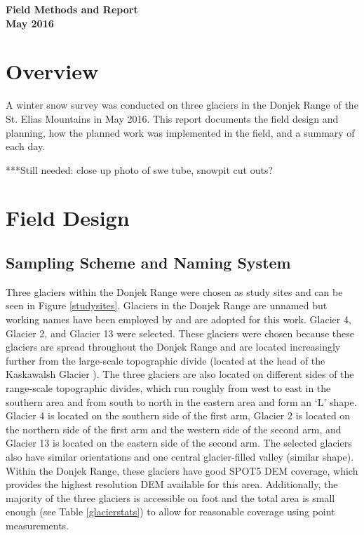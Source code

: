 \documentclass[12pt]{article}
\begin{document}

\begin{center}
\Large \textbf{Field Methods and Report \\ May 2016}
\end{center}


\section*{Overview}

A winter snow survey was conducted on three glaciers in the Donjek Range of the St. Elias Mountains in May 2016. This report documents the field design and planning, how the planned work was implemented in the field, and a summary of each day. 

***Still needed: close up photo of swe tube, snowpit cut outs?

\tableofcontents
\pagebreak

\section{Field Design}

\subsection{Sampling Scheme and Naming System}

Three glaciers within the Donjek Range were chosen as study sites and can be seen in Figure \ref{studysites}. Glaciers in the Donjek Range are unnamed but working names have been employed by \cite{Crompton2016} and are adopted for this work. Glacier 4, Glacier 2, and Glacier 13 were selected. These glaciers were chosen because these glaciers are spread throughout the Donjek Range and are located increasingly further from the large-scale topographic divide (located at the head of the Kaskawalsh Glacier \citep{Taylor1969}). The three glaciers are also located on different sides of the range-scale topographic divides, which run roughly from west to east in the southern area and from south to north in the eastern area and form an `L' shape. Glacier 4 is located on the southern side of the first arm, Glacier 2 is located on the northern side of the first arm and the western side of the second arm, and Glacier 13 is located on the eastern side of the second arm. The selected glaciers also have similar orientations and one central glacier-filled valley (similar shape). Within the Donjek Range, these glaciers have good SPOT5 DEM coverage, which provides the highest resolution DEM available for this area. Additionally, the majority of the three glaciers is accessible on foot and the total area is small enough (see Table \ref{glacierstats}) to allow for reasonable coverage using point measurements.
\end{document}
